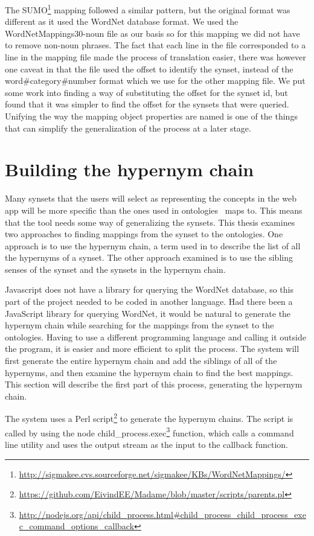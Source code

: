 The SUMO\footnote{\url{http://sigmakee.cvs.sourceforge.net/sigmakee/KBs/WordNetMappings/}} mapping followed a similar pattern,
but the original format was different as it used the WordNet database format.
We used the WordNetMappings30-noun file as our basis so for this mapping we did not have to remove non-noun phrases.
The fact that each line in the file corresponded to a line in the mapping file made the process of translation easier,
there was however one caveat in that the file used the offset to identify the synset,
instead of the word\#category\#number format which we use for the other mapping file.
We put some work into finding a way of substituting the offset for the synset id,
but found that it was simpler to find the offset for the synsets that were queried.
Unifying the way the mapping object properties are named is one of the things that can simplify
the generalization of the process at a later stage.



\section{Building the hypernym chain}
\label{BuildingTheHypernymChain}
Many synsets that the users will select as representing the concepts in the web app will be more specific than
the ones used in ontologies \theartefact\ maps to.
This means that the tool needs some way of generalizing the synsets.
This thesis examines two approaches to finding mappings from the synset to the ontologies.
One approach is to use the hypernym chain,
a term used in \citet{Veres2011} to describe the list of all the hypernyms of a synset.
The other approach examined is to use the sibling senses of the synset and the synsets in the hypernym chain.

Javascript does not have a library for 	querying the WordNet database,
so this part of the project needed to be coded in another language.
Had there been a JavaScript library for querying WordNet,
it would be natural to generate the hypernym chain while searching for the mappings from the synset to the ontologies.
Having to use a different programming language and calling it outside the program,
it is easier and more efficient to split the process.
The system will first generate the entire hypernym chain and add the siblings of all of the hypernyms,
and then examine the hypernym chain to find the best mappings.
This section will describe the first part of this process, generating the hypernym chain.

The system uses a Perl script\footnote{\url{https://github.com/EivindEE/Madame/blob/master/scripts/parents.pl}} to generate the hypernym chains.
The script is called by using the node
child\_process.exec\footnote{\url{http://nodejs.org/api/child\_process.html\#child\_process\_child\_process\_exec\_command\_options\_callback}}
function, which calls a command line utility and uses the output stream as the input to the callback function.

